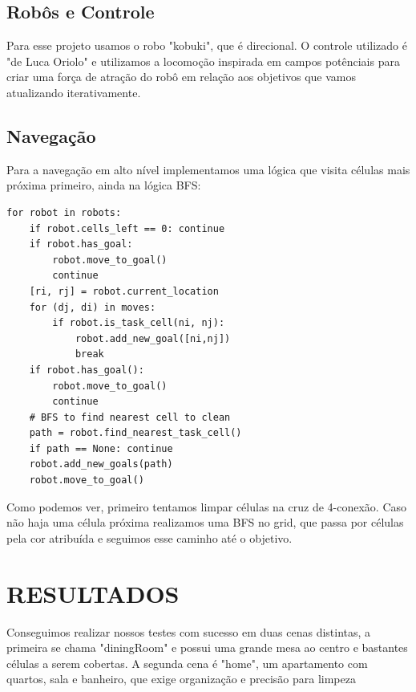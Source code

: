 \documentclass[a4paper, 10pt, conference]{ieeeconf}      %
\begin{document}
\subsection{Robôs e Controle}
Para esse projeto usamos o robo "kobuki", que é direcional. 
O controle utilizado é "de Luca Oriolo" e utilizamos a locomoção 
inspirada em campos potênciais para criar uma força de atração do robô
em relação aos objetivos que vamos atualizando iterativamente.


\subsection{Navegação}

Para a navegação em alto nível implementamos uma lógica que visita células mais próxima primeiro,
ainda na lógica BFS:

\lstset{language=Python}
\begin{lstlisting}
for robot in robots:
    if robot.cells_left == 0: continue
    if robot.has_goal:
        robot.move_to_goal()
        continue
    [ri, rj] = robot.current_location
    for (dj, di) in moves:
        if robot.is_task_cell(ni, nj):
            robot.add_new_goal([ni,nj])
            break
    if robot.has_goal():
        robot.move_to_goal()
        continue
    # BFS to find nearest cell to clean
    path = robot.find_nearest_task_cell()
    if path == None: continue
    robot.add_new_goals(path)
    robot.move_to_goal()

\end{lstlisting}

Como podemos ver, primeiro tentamos limpar células na cruz de 4-conexão. Caso não haja
uma célula próxima realizamos uma BFS no grid, que passa por células pela cor atribuída
e seguimos esse caminho até o objetivo.


\section{RESULTADOS}

Conseguimos realizar nossos testes com sucesso em duas cenas distintas, a primeira se chama
"diningRoom" e possui uma grande mesa ao centro e bastantes células a serem cobertas. A segunda
cena é "home", um apartamento com quartos, sala e banheiro, que exige organização e precisão para limpeza
\end{document}
